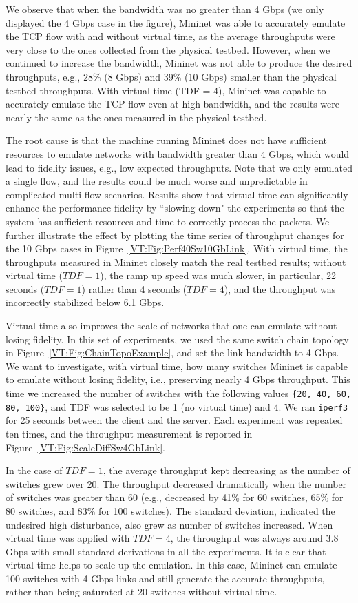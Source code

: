 We observe that when the bandwidth was no greater than 4 Gbps (we only displayed the 4 Gbps case in the figure),
Mininet was able to accurately emulate the TCP flow with and without virtual time,
as the average throughputs were very close to the ones collected from the physical testbed.
However, when we continued to increase the bandwidth, Mininet was not able to produce the desired throughputs, e.g.,
28\% (8 Gbps) and 39\% (10 Gbps) smaller than the physical testbed throughputs.
With virtual time (TDF = 4), Mininet was capable to accurately emulate the TCP flow even at high bandwidth,
and the results were nearly the same as the ones measured in the physical testbed. 

The root cause is that the machine running Mininet does not have sufficient resources to emulate networks with bandwidth greater than 4 Gbps,
which would lead to fidelity issues, e.g., low expected throughputs.
Note that we only emulated a single flow, and the results could be much worse and unpredictable in complicated multi-flow scenarios.
Results show that virtual time can significantly enhance the performance fidelity
by ``slowing down" the experiments so that the system has sufficient resources and time to correctly process the packets.
We further illustrate the effect by plotting the time series of throughput changes for the 10 Gbps cases in Figure~\ref{VT:Fig:Perf40Sw10GbLink}.
With virtual time, the throughputs measured in Mininet closely match the real testbed results;
without virtual time ($TDF = 1$), the ramp up speed was much slower, in particular,
22 seconds ($TDF = 1$) rather than 4 seconds ($TDF = 4$), and the throughput was incorrectly stabilized below 6.1 Gbps.

Virtual time also improves the scale of networks that one can emulate without losing fidelity.
In this set of experiments, we used the same switch chain topology in Figure~\ref{VT:Fig:ChainTopoExample},
and set the link bandwidth to 4 Gbps. We want to investigate, with virtual time,
how many switches Mininet is capable to emulate without losing fidelity, i.e., preserving nearly 4 Gbps throughput.
This time we increased the number of switches with the following values \texttt{\{20, 40, 60, 80, 100\}},
and TDF was selected to be 1 (no virtual time) and 4. We ran \texttt{iperf3} for 25 seconds between the client and the server.
Each experiment was repeated ten times, and the throughput measurement is reported in Figure~\ref{VT:Fig:ScaleDiffSw4GbLink}.

In the case of $TDF = 1$, the average throughput kept decreasing as the number of switches grew over 20.
The throughput decreased dramatically when the number of switches was greater than 60 (e.g., decreased by 41\% for 60 switches, 65\% for 80 switches, and 83\% for 100 switches).
The standard deviation, indicated the undesired high disturbance, also grew as number of switches increased.
When virtual time was applied with $TDF = 4$, the throughput was always around 3.8 Gbps with small standard derivations in all the experiments.
It is clear that virtual time helps to scale up the emulation.
In this case, Mininet can emulate 100 switches with 4 Gbps links and still generate the accurate throughputs,
rather than being saturated at 20 switches without virtual time. 

